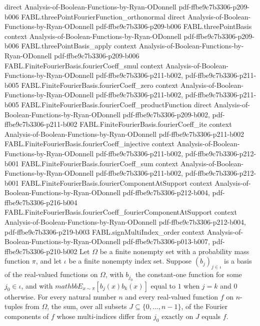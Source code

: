 \begin{theorem}
  {direct}
  {Analysis-of-Boolean-Functions-by-Ryan-ODonnell}
  {pdf-ffbe9c7b3306-p209-b006}
\proofstep
  {FABL.threePointFourierFunction_orthonormal}
  {direct}
  {Analysis-of-Boolean-Functions-by-Ryan-ODonnell}
  {pdf-ffbe9c7b3306-p209-b006}
\proofstep
  {FABL.threePointBasis}
  {context}
  {Analysis-of-Boolean-Functions-by-Ryan-ODonnell}
  {pdf-ffbe9c7b3306-p209-b006}
\proofstep
  {FABL.threePointBasis_apply}
  {context}
  {Analysis-of-Boolean-Functions-by-Ryan-ODonnell}
  {pdf-ffbe9c7b3306-p209-b006}
\proofstep
  {FABL.FiniteFourierBasis.fourierCoeff_smul}
  {context}
  {Analysis-of-Boolean-Functions-by-Ryan-ODonnell}
  {pdf-ffbe9c7b3306-p211-b002,
    pdf-ffbe9c7b3306-p211-b005}
\proofstep
  {FABL.FiniteFourierBasis.fourierCoeff_zero}
  {context}
  {Analysis-of-Boolean-Functions-by-Ryan-ODonnell}
  {pdf-ffbe9c7b3306-p211-b002,
    pdf-ffbe9c7b3306-p211-b005}
\proofstep
  {FABL.FiniteFourierBasis.fourierCoeff_productFunction}
  {direct}
  {Analysis-of-Boolean-Functions-by-Ryan-ODonnell}
  {pdf-ffbe9c7b3306-p209-b002,
    pdf-ffbe9c7b3306-p211-b002}
\proofstep
  {FABL.FiniteFourierBasis.fourierCoeff_ite}
  {context}
  {Analysis-of-Boolean-Functions-by-Ryan-ODonnell}
  {pdf-ffbe9c7b3306-p211-b002}
\proofstep
  {FABL.FiniteFourierBasis.fourierCoeff_injective}
  {context}
  {Analysis-of-Boolean-Functions-by-Ryan-ODonnell}
  {pdf-ffbe9c7b3306-p211-b002,
    pdf-ffbe9c7b3306-p212-b001}
\proofstep
  {FABL.FiniteFourierBasis.fourierCoeff_sum}
  {context}
  {Analysis-of-Boolean-Functions-by-Ryan-ODonnell}
  {pdf-ffbe9c7b3306-p211-b002,
    pdf-ffbe9c7b3306-p212-b001}
\proofstep
  {FABL.FiniteFourierBasis.fourierComponentAtSupport}
  {context}
  {Analysis-of-Boolean-Functions-by-Ryan-ODonnell}
  {pdf-ffbe9c7b3306-p212-b004,
    pdf-ffbe9c7b3306-p216-b004}
\proofstep
  {FABL.FiniteFourierBasis.fourierCoeff_fourierComponentAtSupport}
  {context}
  {Analysis-of-Boolean-Functions-by-Ryan-ODonnell}
  {pdf-ffbe9c7b3306-p212-b004,
    pdf-ffbe9c7b3306-p219-b003}
\proofstep
  {FABL.signMultiIndex_order}
  {context}
  {Analysis-of-Boolean-Functions-by-Ryan-ODonnell}
  {pdf-ffbe9c7b3306-p013-b007,
    pdf-ffbe9c7b3306-p210-b002}
Let $\Omega$ be a finite nonempty set with a probability mass function $\pi$, and let
$\iota$ be a finite nonempty index set. Suppose $(b_j)_{j\in\iota}$ is a basis of the
real-valued functions on $\Omega$, with $b_{j_0}$ the constant-one function for some
$j_0\in\iota$, and with $mathbb{E}_{x\sim\pi}[b_j(x)b_k(x)]$ equal to $1$ when $j=k$ and
$0$ otherwise. For every natural number $n$ and every real-valued function $f$ on
$n$-tuples from $\Omega$, the sum, over all subsets $J\subseteq\{0,\ldots,n-1\}$, of the
Fourier components of $f$ whose multi-indices differ from $j_0$ exactly on $J$ equals
$f$.
\end{theorem}

